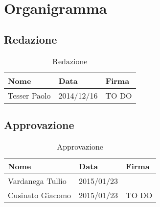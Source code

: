 %

\appendix

\section{Organigramma} %
\label{sec:organigramma}
	\subsection{Redazione} %
	\label{sub:redazione}
		\begin{table}[!h]
			\begin{center}
				\begin{tabularx}{0.8\textwidth}{|X|X|X|}
					\hline
					\textbf{Nome} & \textbf{Data} & \textbf{Firma} \\
					\hline
					\rule[-4mm]{0mm}{1cm}
					Tesser Paolo &
					2014/12/16 &
					TO DO \\
					\hline
				\end{tabularx}
			\end{center}
		\caption{Redazione}
		\end{table}
	
	\subsection{Approvazione} %
	\label{sub:approvazione}
		\begin{table}[!h]
			\begin{center}
				\begin{tabularx}{0.8\textwidth}{|X|X|X|}
					\hline
					\textbf{Nome} & \textbf{Data} & \textbf{Firma} \\
					\hline
					\rule[-4mm]{0mm}{1cm}
					Vardanega Tullio &
					2015/01/23 &
					\\
					\hline
					\rule[-4mm]{0mm}{1cm}
					Cusinato Giacomo &
					2015/01/23 &
					TO DO \\
					\hline
				\end{tabularx}
			\end{center}
		\caption{Approvazione}
		\end{table}
	
